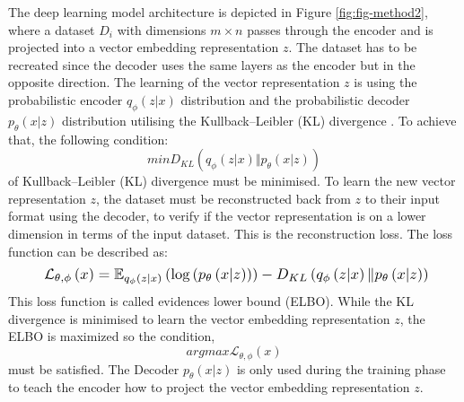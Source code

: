 The deep learning model architecture is depicted in Figure \ref{fig:fig-method2}, where a dataset $D_i$ with dimensions $m \times n$ passes through the encoder and is projected into a vector embedding representation $z$. The dataset has to be recreated since the decoder uses the same layers as the encoder but in the opposite direction. The learning of the vector representation $z$ is using the probabilistic encoder $q_\phi\left(z|x\right)$ distribution and the probabilistic decoder $p_\theta\left(x|z\right)$ distribution utilising the Kullback–Leibler (KL) divergence \cite{b2KLDivergence}. To achieve that, the following condition:
\begin{equation}
    minD_{KL}\left( q_\phi\left(z|x\right) \Vert p_\theta\left(x|z\right) \right)\label{eq_4_method}
\end{equation} 
of Kullback–Leibler (KL) divergence must be minimised. %
To learn the new vector representation $z$, the dataset must be reconstructed back from $z$ to their input format using the decoder, to verify if the vector representation is on a lower dimension in terms of the input dataset. This is the reconstruction loss. The loss function can be described as:
\begin{equation}
     \resizebox{.9\hsize}{!}{ $\mathcal{L}_{\theta, \phi}\left(x\right) = \mathbb{E}_{q_\phi\left(z|x\right)}\left(\log{\left(p_\theta\left(x|z\right)\right)}\right) - D_{KL}\left( q_\phi\left(z|x\right) \Vert p_\theta\left(x|z\right) \right) \label{eq_5_method} $}%
\end{equation}
This loss function is called evidences lower bound (ELBO). While the KL divergence is minimised to learn the vector embedding representation $z$, the ELBO is maximized so the condition, 
\begin{equation}
      argmax\mathcal{L}_{\theta, \phi}\left(x\right) \label{eq_6_method}
\end{equation}
must be satisfied. The Decoder $p_\theta\left(x|z\right)$ is only used during the training phase to teach the encoder how to project the vector embedding representation $z$.

